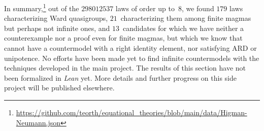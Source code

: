 In summary,\footnote{\url{https://github.com/teorth/equational_theories/blob/main/data/Higman-Neumann.json}} out of the $\num{298012537}$ laws of order up to~$8$, we found $179$ laws characterizing Ward quasigroups, $21$~characterizing them among finite magmas but perhaps not infinite ones, and $13$~candidates for which we have neither a counterexample nor a proof even for finite magmas, but which we know that cannot have a countermodel with a right identity element, nor satisfying ARD or unipotence. No efforts have been made yet to find infinite countermodels with the techniques developed in the main project. The results of this section have not been formalized in \emph{Lean} yet. More details and further progress on this side project will be published elsewhere.
